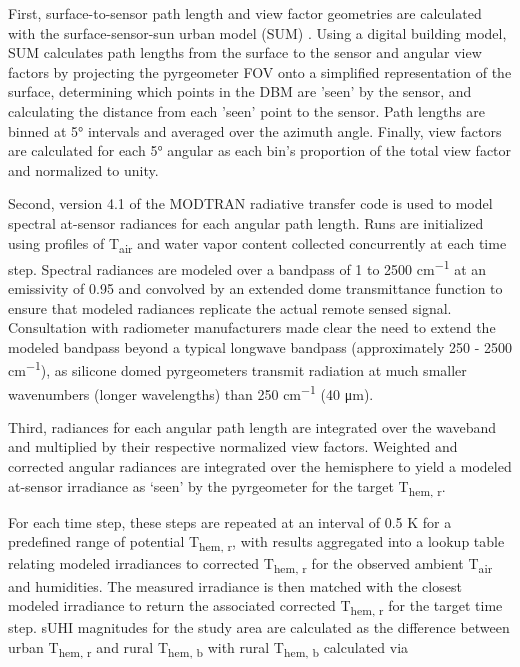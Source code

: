 \begin{bibunit}
First, surface-to-sensor path length and view factor geometries are calculated with the surface-sensor-sun urban model (SUM) \citep{Soux2004}. Using a digital building model, SUM calculates path lengths from the surface to the sensor and angular view factors by projecting the pyrgeometer FOV onto a simplified representation of the surface, determining which points in the DBM are 'seen' by the sensor, and calculating the distance from each 'seen' point to the sensor. Path lengths are binned at 5\si{\degree} intervals and averaged over the azimuth angle. Finally, view factors are calculated for each 5\si{\degree} angular as each bin's proportion of the total view factor and normalized to unity.

Second, version 4.1 of the MODTRAN radiative transfer code \citep{Berk1987} is used to model spectral at-sensor radiances for each angular path length. Runs are initialized using profiles of T\textsubscript{air} and water vapor content collected concurrently at each time step. Spectral radiances are modeled over a bandpass of 1 to 2500 \si{cm^{-1}} at an emissivity of 0.95 and convolved by an extended dome transmittance function to ensure that modeled radiances replicate the actual remote sensed signal. Consultation with radiometer manufacturers made clear the need to extend the modeled bandpass beyond a typical longwave bandpass (approximately 250 - 2500 \si{cm^{-1}}), as silicone domed pyrgeometers transmit radiation at much smaller wavenumbers (longer wavelengths) than 250 \si{cm^{-1}} (40 \si{\micro\meter}).

Third, radiances for each angular path length are integrated over the waveband and multiplied by their respective normalized view factors. Weighted and corrected angular radiances are integrated over the hemisphere to yield a modeled at-sensor irradiance as ‘seen’ by the pyrgeometer for the target T\textsubscript{hem, r}. 

For each time step, these steps are repeated at an interval of 0.5 \si{\kelvin} for a predefined range of potential T\textsubscript{hem, r}, with results aggregated into a lookup table relating modeled irradiances to corrected T\textsubscript{hem, r} for the observed ambient T\textsubscript{air} and humidities. The measured irradiance is then matched with the closest modeled irradiance to return the associated corrected T\textsubscript{hem, r} for the target time step. sUHI magnitudes for the study area are calculated as the difference between urban T\textsubscript{hem, r} and rural T\textsubscript{hem, b} with rural T\textsubscript{hem, b} calculated via


\end{bibunit}
